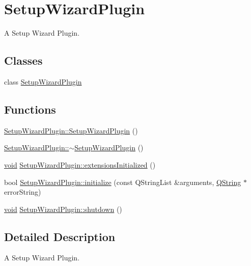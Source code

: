 \hypertarget{group___setup_wizard_plugin}{\section{\-Setup\-Wizard\-Plugin}
\label{group___setup_wizard_plugin}
}


\-A \-Setup \-Wizard \-Plugin.  


\subsection*{\-Classes}
\begin{DoxyCompactItemize}
\item 
class \hyperlink{class_setup_wizard_plugin}{\-Setup\-Wizard\-Plugin}
\end{DoxyCompactItemize}
\subsection*{\-Functions}
\begin{DoxyCompactItemize}
\item 
\hyperlink{group___setup_wizard_plugin_ga3aa7966c2f38a762e4669751ccdf470a}{\-Setup\-Wizard\-Plugin\-::\-Setup\-Wizard\-Plugin} ()
\item 
\hyperlink{group___setup_wizard_plugin_ga57537cb52f05ade3a3fbe59ca00d187b}{\-Setup\-Wizard\-Plugin\-::$\sim$\-Setup\-Wizard\-Plugin} ()
\item 
\hyperlink{group___u_a_v_objects_plugin_ga444cf2ff3f0ecbe028adce838d373f5c}{void} \hyperlink{group___setup_wizard_plugin_gaa612baf865ac69fa057ec64987c86ff4}{\-Setup\-Wizard\-Plugin\-::extensions\-Initialized} ()
\item 
bool \hyperlink{group___setup_wizard_plugin_ga2ea2069466d237ee561815a5a00f7a4e}{\-Setup\-Wizard\-Plugin\-::initialize} (const \-Q\-String\-List \&arguments, \hyperlink{group___u_a_v_objects_plugin_gab9d252f49c333c94a72f97ce3105a32d}{\-Q\-String} $\ast$error\-String)
\item 
\hyperlink{group___u_a_v_objects_plugin_ga444cf2ff3f0ecbe028adce838d373f5c}{void} \hyperlink{group___setup_wizard_plugin_ga982d4e38aff329d0dfc32506a4eb5539}{\-Setup\-Wizard\-Plugin\-::shutdown} ()
\end{DoxyCompactItemize}


\subsection{\-Detailed \-Description}
\-A \-Setup \-Wizard \-Plugin. 

